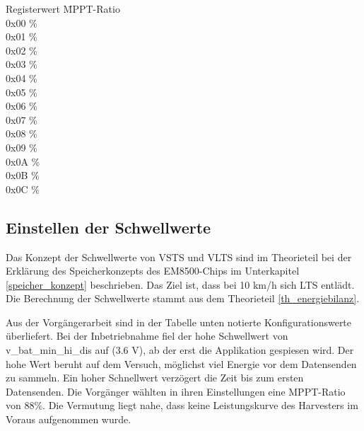 \begin{minipage}{\textwidth}
    \begin{tabbing}
    Registerwert   \quad\= MPPT-Ratio    \\[0.8ex]
    0x00           \thinspace\% \\
    0x01           \thinspace\%\\
    0x02           \thinspace\%\\
    0x03           \thinspace\%\\
    0x04           \thinspace\%\\
    0x05           \thinspace\%\\
    0x06           \thinspace\% \\
    0x07           \thinspace\%\\
    0x08           \thinspace\%\\
    0x09           \thinspace\%\\
    0x0A           \thinspace\% \\
    0x0B           \thinspace\%\\
    0x0C           \thinspace\%\\
    \end{tabbing}
\end{minipage}


\subsection{Einstellen der Schwellwerte}
\label{v_schwellwerte}

Das Konzept der Schwellwerte von VSTS und VLTS sind im Theorieteil bei der Erklärung des Speicherkonzepts des EM8500-Chips im Unterkapitel \ref{speicher_konzept} beschrieben. Das Ziel ist, dass bei 10 km/h sich LTS entlädt. Die Berechnung der Schwellwerte stammt aus dem Theorieteil \ref{th_energiebilanz}.

Aus der Vorgängerarbeit sind in der Tabelle unten notierte Konfigurationswerte überliefert. Bei der Inbetriebnahme fiel der hohe Schwellwert von v\_bat\_min\_hi\_dis auf (3.6 V), ab der erst die Applikation gespiesen wird. Der hohe Wert beruht auf dem Versuch, möglichst viel Energie vor dem Datensenden zu sammeln. Ein hoher Schnellwert verzögert die Zeit bis zum ersten Datensenden. Die Vorgänger wählten in ihren Einstellungen eine MPPT-Ratio von 88\thinspace\%. Die Vermutung liegt nahe, dass keine Leistungskurve des Harvesters im Voraus aufgenommen wurde.


